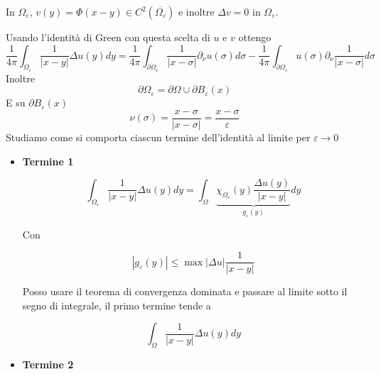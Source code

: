\documentclass[10pt,a4paper,twoside,openright]{book}
\begin{document}
\begin{dimostrazione}
	In $\displaystyle \Omega _{\varepsilon }$, $\displaystyle v(y) =\Phi (x-y) \in C^{2}\left(\overline{\Omega _{\varepsilon }}\right)$ e inoltre $\displaystyle \Delta v=0$ in $\displaystyle \Omega _{\varepsilon }$.
	
	Usando l'identità di Green con questa scelta di $\displaystyle u$ e $\displaystyle v$ ottengo
	\begin{equation*}
		\frac{1}{4\pi }\int _{\Omega _{\varepsilon }}\frac{1}{| x-y| } \Delta u(y) dy=\frac{1}{4\pi }\int _{\partial \Omega _{\varepsilon }}\frac{1}{| x-\sigma | } \partial _{\nu } u(\sigma) d\sigma -\frac{1}{4\pi }\int _{\partial \Omega _{\varepsilon }} u(\sigma) \partial _{\nu }\frac{1}{| x-\sigma | } d\sigma 
	\end{equation*}
	Inoltre
	\begin{equation*}
		\partial \Omega _{\varepsilon } =\partial \Omega \cup \partial B_{\varepsilon }(x)
	\end{equation*}
	E su $\displaystyle \partial B_{\varepsilon }(x)$
	\begin{equation*}
		\nu (\sigma) =\frac{x-\sigma }{| x-\sigma | } =\frac{x-\sigma }{\varepsilon }
	\end{equation*}
	Studiamo come si comporta ciascun termine dell'identità al limite per $\displaystyle \varepsilon \rightarrow 0$
	\begin{itemize}
		\item \textbf{Termine 1}
		      
		      \begin{equation*}
		      	\int _{\Omega _{\varepsilon }}\frac{1}{| x-y| } \Delta u(y) dy=\int _{\Omega }\underbrace{\chi _{\Omega _{\varepsilon }}(y)\frac{\Delta u(y)}{| x-y| }}_{g_{\varepsilon }(y)} dy
		      \end{equation*}
		      
		      Con 
		      
		      \begin{equation*}
		      	| g_{\varepsilon }(y)| \leqslant \max| \Delta u| \frac{1}{| x-y| }
		      \end{equation*}
		      
		      Posso usare il teorema di convergenza dominata e passare al limite sotto il segno di integrale, il primo termine tende a
		      
		      \begin{equation*}
		      	\int _{\Omega }\frac{1}{| x-y| } \Delta u(y) dy
		      \end{equation*}
		\item \textbf{Termine 2}
		      

\end{itemize}
\end{dimostrazione}
\end{document}
